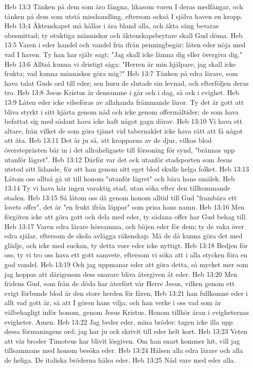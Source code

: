 Heb 13:3  Tänken på dem som äro fångna, likasom voren I deras medfångar, och tänken på dem som utstå misshandling, eftersom också I själva haven en kropp.
Heb 13:4  Äktenskapet må hållas i ära bland alla, och äkta säng bevaras obesmittad; ty otuktiga människor och äktenskapsbrytare skall Gud döma.
Heb 13:5  Varen i eder handel och vandel fria ifrån penningbegär; låten eder nöja med vad I haven. Ty han har själv sagt: "Jag skall icke lämna dig eller övergiva dig."
Heb 13:6  Alltså kunna vi dristigt säga: "Herren är min hjälpare, jag skall icke frukta; vad kunna människor göra mig?"
Heb 13:7  Tänken på edra lärare, som hava talat Guds ord till eder; sen huru de slutade sin levnad, och efterföljen deras tro.
Heb 13:8  Jesus Kristus är densamme i går och i dag, så ock i evighet.
Heb 13:9  Låten eder icke vilseföras av allahanda främmande läror. Ty det är gott att bliva styrkt i sitt hjärta genom nåd och icke genom offermåltider; de som hava befattat sig med sådant hava icke haft något gagn därav.
Heb 13:10  Vi hava ett altare, från vilket de som göra tjänst vid tabernaklet icke hava rätt att få något att äta.
Heb 13:11  Det är ju så, att kropparna av de djur, vilkas blod översteprästen bär in i det allraheligaste till försoning för synd, "brännas upp utanför lägret".
Heb 13:12  Därför var det ock utanför stadsporten som Jesus utstod sitt lidande, för att han genom sitt eget blod skulle helga folket.
Heb 13:13  Låtom oss alltså gå ut till honom "utanför lägret" och bära hans smälek.
Heb 13:14  Ty vi hava här ingen varaktig stad, utan söka efter den tillkommande staden.
Heb 13:15  Så låtom oss då genom honom alltid till Gud "frambära ett lovets offer", det är "en frukt ifrån läppar" som prisa hans namn.
Heb 13:16  Men förgäten icke att göra gott och dela med eder, ty sådana offer har Gud behag till.
Heb 13:17  Varen edra lärare hörsamma, och böjen eder för dem; ty de vaka över edra själar, eftersom de skola avlägga räkenskap. Må de då kunna göra det med glädje, och icke med suckan, ty detta vore eder icke nyttigt.
Heb 13:18  Bedjen för oss; ty vi tro oss hava ett gott samvete, eftersom vi söka att i alla stycken föra en god vandel.
Heb 13:19  Och jag uppmanar eder att göra detta, så mycket mer som jag hoppas att därigenom dess snarare bliva återgiven åt eder.
Heb 13:20  Men fridens Gud, som från de döda har återfört vår Herre Jesus, vilken genom ett evigt förbunds blod är den store herden för fåren,
Heb 13:21  han fullkomne eder i allt vad gott är, så att I gören hans vilja; och han verke i oss vad som är välbehagligt inför honom, genom Jesus Kristus. Honom tillhör äran i evigheternas evigheter. Amen.
Heb 13:22  Jag beder eder, mina bröder: tagen icke illa upp dessa förmaningens ord; jag har ju ock skrivit till eder helt kort.
Heb 13:23  Veten att vår broder Timoteus har blivit lösgiven. Om han snart kommer hit, vill jag tillsammans med honom besöka eder.
Heb 13:24  Hälsen alla edra lärare och alla de heliga. De italiska bröderna hälsa eder.
Heb 13:25  Nåd vare med eder alla.


